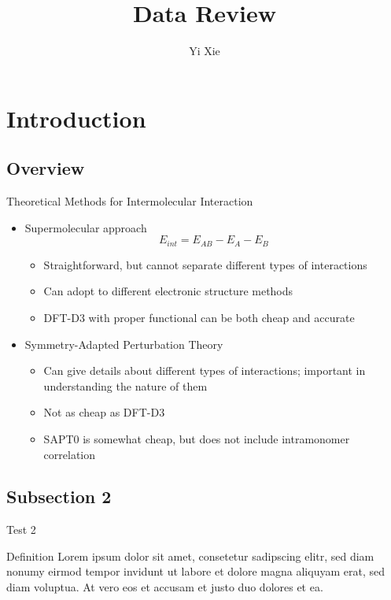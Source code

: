 \documentclass{beamer}
\title{Data Review}
\author{Yi Xie}
\begin{document}
\GTtitle

\section{Introduction}

    \subsection{Overview}

		\begin{frame}{Theoretical Methods for Intermolecular Interaction}
		  \begin{itemize}
		      \item Supermolecular approach 
		        $$E_{int} = E_{AB} - E_A - E_B$$
		        \begin{itemize}
		            \item Straightforward, but cannot separate different types of interactions
		            \item Can adopt to different electronic structure methods
					\item DFT-D3 with proper functional can be both cheap and accurate
		        \end{itemize}
		      \item Symmetry-Adapted Perturbation Theory
		      \begin{itemize}
		          \item Can give details about different types of interactions; important in understanding the nature of them
		          \item Not as cheap as DFT-D3
				  \item SAPT0 is somewhat cheap, but does not include intramonomer correlation
		      \end{itemize}
		  \end{itemize}
		\end{frame}

    \subsection{Subsection 2}

        \begin{frame}{Test 2}
            \begin{block}{Definition}
                Lorem ipsum dolor sit amet, consetetur sadipscing elitr, sed diam nonumy eirmod tempor invidunt ut labore et dolore magna aliquyam erat, sed diam voluptua. At vero eos et accusam et justo duo dolores et ea.
            \end{block}
        \end{frame}
\end{document}
